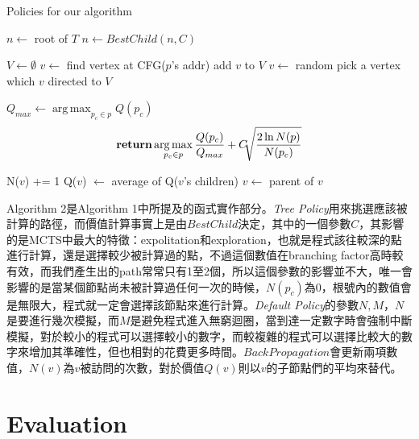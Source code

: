 \documentclass[12pt,a4paper,oneside]{book}
\DeclareMathOperator*{\argmax}{arg\,max}
\begin{document}
\begin{algorithm}[htbp]
  \caption{Policies for our algorithm}
  \begin{algorithmic}[]
    	\State $n \leftarrow$ root of $T$
            	\State {}
            \Else
            	\State $n \leftarrow BestChild(n,C)$
            \EndIf
        \EndWhile
    \EndFunction
    \item[]
    	\State $V \leftarrow \emptyset$
          \State $v \leftarrow$ find vertex at CFG($p$'s addr)
              \State add $v$ to $V$
              \State $v \leftarrow$ random pick a vertex which $v$ directed to
          \EndFor
        \EndFor
        \State \Return $V$
    \EndFunction
    \item[]
    	\State $Q_{max} \leftarrow \operatorname*{arg\,max}_{p_c \in p} Q(p_c)$
    	\State \[ \Return \argmax_{p_c \in p} \frac{Q(p_c)}{Q_{max}}+C\sqrt[]{\frac{2\ln N(p)}{N(p_c)}} \]
    \EndFunction
    \item[]
    	\State N($v$) += 1
		\State Q($v$) $\leftarrow$ average of Q($v$'s children)
    \State $v \leftarrow$ parent of $v$
    \EndWhile
    \EndFunction
  \end{algorithmic}
\end{algorithm}

Algorithm 2是Algorithm 1中所提及的函式實作部分。\textit{Tree Policy}用來挑選應該被計算的路徑，而價值計算事實上是由$BestChild$決定，其中的一個參數$C$，其影響的是MCTS中最大的特徵：expolitation和exploration，也就是程式該往較深的點進行計算，還是選擇較少被計算過的點，不過這個數值在branching factor高時較有效，而我們產生出的path常常只有1至2個，所以這個參數的影響並不大，唯一會影響的是當某個節點尚未被計算過任何一次的時候，$N(p_c)$為0，根號內的數值會是無限大，程式就一定會選擇該節點來進行計算。\textit{Default Policy}的參數$N,M$，$N$是要進行幾次模擬，而$M$是避免程式進入無窮迴圈，當到達一定數字時會強制中斷模擬，對於較小的程式可以選擇較小的數字，而較複雜的程式可以選擇比較大的數字來增加其準確性，但也相對的花費更多時間。$BackPropagation$會更新兩項數值，$N(v)$為$v$被訪問的次數，對於價值$Q(v)$則以$v$的子節點們的平均來替代。

\chapter{Evaluation}
\end{document}
